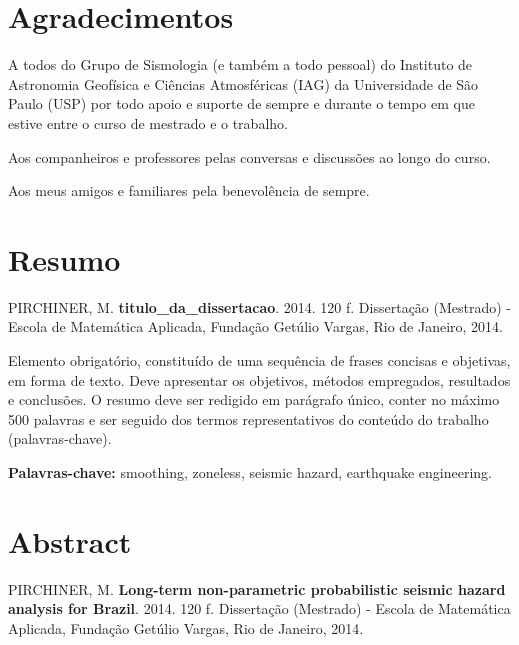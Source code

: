\documentclass[12pt,twoside,a4paper]{book}
\numberwithin{equation}{section}
\begin{document}



\chapter*{Agradecimentos}
A todos do Grupo de Sismologia (e também a todo pessoal) do Instituto de
Astronomia Geofísica e Ciências Atmosféricas (IAG) da Universidade de São Paulo (USP) 
por todo apoio e suporte de sempre e durante o tempo em que
estive entre o curso de mestrado e o trabalho.

Aos companheiros e professores pelas conversas e discussões ao longo do curso.

Aos meus amigos e familiares pela benevolência de sempre.


\chapter*{Resumo}

\noindent PIRCHINER, M. \textbf{\glsdesc*{titulo_da_dissertacao}}. 
2014. 120 f.
Dissertação (Mestrado) - Escola de Matemática Aplicada,
Fundação Getúlio Vargas, Rio de Janeiro, 2014.




Elemento
obrigatório, constituído de uma sequência de frases concisas e objetivas, em forma de texto.  
Deve apresentar os objetivos, métodos empregados, resultados e conclusões.  
O resumo deve ser redigido em parágrafo único, conter
no máximo 500 palavras e ser seguido dos termos representativos do conteúdo do
trabalho (palavras-chave). 



\noindent \textbf{Palavras-chave:} smoothing, zoneless, seismic hazard,
earthquake engineering.

\chapter*{Abstract}
\noindent PIRCHINER, M. \textbf{Long-term non-parametric probabilistic seismic
hazard analysis for Brazil}.
2014. 120 f.
Dissertação (Mestrado) - Escola de Matemática Aplicada,
Fundação Getúlio Vargas, Rio de Janeiro, 2014.
\\
\end{document}

